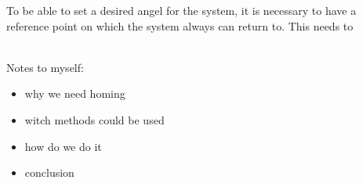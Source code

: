 \documentclass[../../../main]{subfiles}
\begin{document}
 
To be able to set a desired angel for the system, it is necessary to have a reference point on which the system always can return to. 
 This needs to 


 \\
 Notes to myself:
\begin{itemize}
    \item why we need homing
    \item witch methods could be used
    \item how do we do it
    \item conclusion 
\end{itemize}
\end{document}
